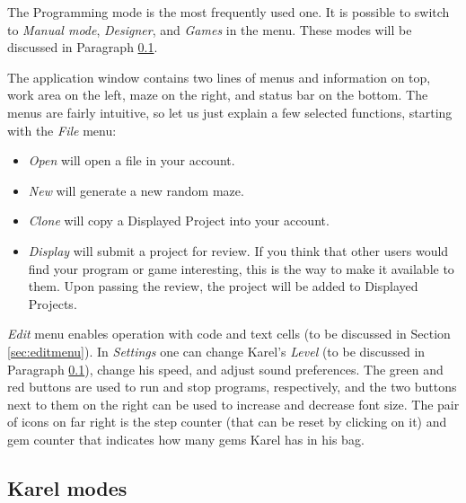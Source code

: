 \documentclass[article,A4,12pt]{llncs}
\begin{document}
\noindent
The Programming mode is the most frequently used one. It is possible to 
switch to {\em Manual mode}, {\em Designer}, and {\em Games} in the menu. 
These modes will be discussed in Paragraph \ref{levels}.

The application window contains two lines of menus and information on top,
work area on the left, maze on the right, and status bar on the bottom.
The menus are fairly intuitive, so let us just explain a few selected 
functions, starting with the {\em File} menu:

\begin{itemize}
\item {\em Open} will open a file in your account.
\item {\em New} will generate a new random maze.
\item {\em Clone} will copy a Displayed Project into your account. 
\item {\em Display} will submit a project for review. If you think that 
      other users would find your program or game interesting, this is the way to make it 
      available to them. Upon passing the review, the project will be added to Displayed Projects.
\end{itemize}
{\em Edit} menu enables operation with code and text cells (to be discussed in 
Section \ref{sec:editmenu}). In {\em Settings} one can change Karel's {\em Level} (to be discussed
in Paragraph \ref{levels}), change his speed, and adjust sound preferences. The green and red 
buttons are used to run and stop programs, respectively, and the two buttons next to them on
the right can be used to increase and decrease font size. The pair of icons on far right is the 
step counter (that can be reset by clicking on it) and gem counter that indicates how many gems 
Karel has in his bag.

\subsection{Karel modes} \label{levels}
\end{document}
